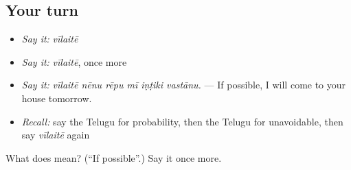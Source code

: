 \subsection*{Your turn}
\begin{itemize}
\raggedright
  \item \emph{Say it:} \emph{vīlaitē}
  \item \emph{Say it:} \emph{vīlaitē}, once more
  \item \emph{Say it:} \emph{vīlaitē nēnu rēpu mī iṇṭiki vastānu.} — If possible, I will come to your house tomorrow.
  \item \emph{Recall:} say the Telugu for probability, then the Telugu for unavoidable, then say \emph{vīlaitē} again
\end{itemize}

\begin{tcolorbox}[breakable,colback=teal!4,colframe=teal!35!black,title={Before you move on}]
What does  mean? (\textquotedblleft{}If possible\textquotedblright{}.) Say it once more.
\end{tcolorbox}
